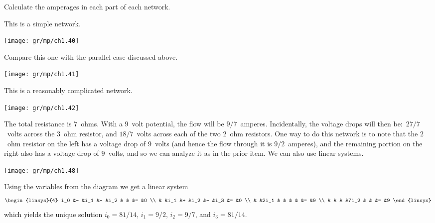 \begin{exercises}
  \item 
    Calculate the amperages in each part of each network.
    \begin{exparts}
      \partsitem This is a simple network.
          \begin{center}
             \texttt{[image: gr/mp/ch1.40]}
        \end{center}
      \partsitem Compare this one with the parallel case discussed above.
          \begin{center}
             \texttt{[image: gr/mp/ch1.41]}
        \end{center}
      \partsitem This is a reasonably complicated network.
          \begin{center}
           \texttt{[image: gr/mp/ch1.42]}
        \end{center}
    \end{exparts}
    \begin{answer}
      \begin{exparts}
        \partsitem The total resistance is $7$~ohms.
          With a $9$~volt potential, the flow will be $9/7$~amperes.
          Incidentally, the voltage drops will then be:~$27/7$~volts
          across the $3$~ohm resistor, and $18/7$~volts across each of
          the two $2$~ohm resistors.        
        \partsitem One way to do this network is to note that the $2$~ohm
          resistor on the left has a voltage drop of $9$~volts
          (and hence the flow through it is $9/2$~amperes), and the 
          remaining portion on the right also has a voltage drop of 
          $9$~volts, and so we can analyze it as in the prior item.
          We can also use linear systems.
          \begin{center}
            \texttt{[image: gr/mp/ch1.48]}
          \end{center}
          Using the variables from the diagram we get a linear system
          \begin{equation*}
            \begin{linsys}{4}
              i_0  &- &i_1  &- &i_2  &  &    &= &0  \\
                   &  &i_1  &+ &i_2  &- &i_3 &= &0  \\
                   &  &2i_1 &  &     &  &    &= &9  \\  
                   &  &     &  &7i_2 &  &    &= &9       
            \end{linsys}
          \end{equation*}
          which yields the unique solution $i_0=81/14$, $i_1=9/2$, $i_2=9/7$,
          and $i_3=81/14$.


\end{exparts}
\end{answer}
\end{exercises}

